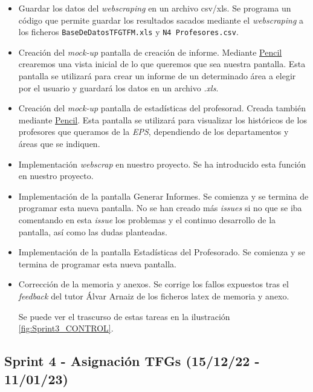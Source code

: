 \begin{itemize}
	
	\item Guardar los datos del \emph{webscraping} en un archivo csv/xls. Se programa un código que permite guardar los resultados sacados mediante el \emph{webscraping} a los ficheros \texttt{BaseDeDatosTFGTFM.xls} y \texttt{N4 Profesores.csv}.
	
	\item Creación del \emph{mock-up} pantalla de creación de informe. Mediante \href{https://pencil.evolus.vn/}{Pencil} crearemos una vista inicial de lo que queremos que sea nuestra pantalla. Esta pantalla se utilizará para crear un informe de un determinado área a elegir por el usuario y guardará los datos en un archivo \emph{.xls}.
	
	\item Creación del \emph{mock-up} pantalla de estadísticas del profesorad. Creada también mediante \href{https://pencil.evolus.vn/}{Pencil}. Esta pantalla se utilizará para visualizar los históricos de los profesores que queramos de la \emph{EPS}, dependiendo de los departamentos y áreas que se indiquen.
	
	\item Implementación \emph{webscrap} en nuestro proyecto. Se ha introducido esta función en nuestro proyecto.
	
	\item Implementación de la pantalla Generar Informes. Se comienza y se termina de programar esta nueva pantalla. No se han creado más \emph{issues} si no que se iba comentando en esta \emph{issue} los problemas y el continuo desarrollo de la pantalla, así como las dudas planteadas.
	
	\item Implementación de la pantalla Estadísticas del Profesorado. Se comienza y se termina de programar esta nueva pantalla.
	
	\item Corrección de la memoria y anexos. Se corrige los fallos expuestos tras el \emph{feedback} del tutor Álvar Arnaiz de los ficheros latex de memoria y anexo.
	
	Se puede ver el trascurso de estas tareas en la ilustración \ref{fig:Sprint3_CONTROL}.
	
	
\end{itemize}

\subsection{Sprint 4 - Asignación TFGs (15/12/22 - 11/01/23) }

